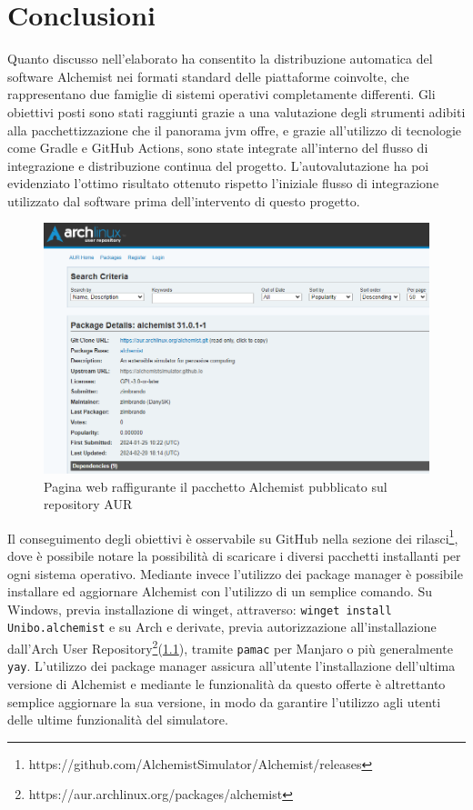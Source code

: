 
\chapter{Conclusioni}
Quanto discusso nell'elaborato ha consentito la distribuzione automatica del software Alchemist nei formati standard delle piattaforme coinvolte, che rappresentano due famiglie di sistemi operativi completamente differenti. Gli obiettivi posti sono stati raggiunti grazie a una valutazione degli strumenti adibiti alla pacchettizzazione che il panorama \ac{jvm} offre, e grazie all'utilizzo di tecnologie come Gradle e GitHub Actions, sono state integrate all'interno del flusso di integrazione e distribuzione continua del progetto. L'autovalutazione ha poi evidenziato l'ottimo risultato ottenuto rispetto l'iniziale flusso di integrazione utilizzato dal software prima dell'intervento di questo progetto.

\begin{figure}[htb]
	\centering
	\includegraphics[width=.8\linewidth]{figures/alchemist-aur.png}
	\caption{Pagina web raffigurante il pacchetto Alchemist pubblicato sul repository AUR}
	\label{fig:aur-web}
\end{figure}

Il conseguimento degli obiettivi è osservabile su GitHub nella sezione dei rilasci\footnote{https://github.com/AlchemistSimulator/Alchemist/releases}, dove è possibile notare la possibilità di scaricare i diversi pacchetti installanti per ogni sistema operativo. Mediante invece l'utilizzo dei package manager è possibile installare ed aggiornare Alchemist con l'utilizzo di un semplice comando. Su Windows, previa installazione di winget, attraverso:
\texttt{winget install Unibo.alchemist}
e su Arch e derivate, previa autorizzazione all'installazione dall'Arch User Repository\footnote{https://aur.archlinux.org/packages/alchemist}(\cref{fig:aur-web}), tramite \texttt{pamac} per Manjaro o più generalmente \texttt{yay}.
L'utilizzo dei package manager assicura all'utente l'installazione dell'ultima versione di Alchemist e mediante le funzionalità da questo offerte è altrettanto semplice aggiornare la sua versione, in modo da garantire l'utilizzo agli utenti delle ultime funzionalità del simulatore. 

